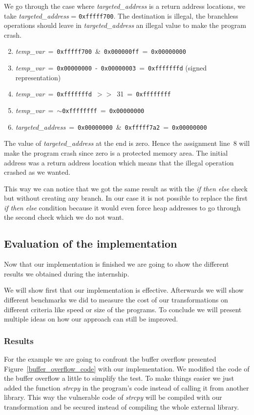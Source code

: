 \documentclass[11pt]{sdm}
\begin{document}
We go through the case where \textit{targeted\_address} is a return address locations, we take \textit{targeted\_address} = \texttt{0xfffff700}. 
The destination is illegal, the branchless operations should leave in \textit{targeted\_address} an illegal value to make the program crash.
\begin{enumerate}[noitemsep]
	\setcounter{enumi}{1}
	\item \textit{temp\_var}~=~\texttt{0xfffff700}~\&~\texttt{0x000000ff}~=~\texttt{0x00000000}
	\item \textit{temp\_var}~=~\texttt{0x00000000}~-~\texttt{0x00000003}~=~\texttt{0xfffffffd} (signed representation)
	\item \textit{temp\_var}~=~\texttt{0xfffffffd}~$>>$~31~=~\texttt{0xffffffff}
	\item \textit{temp\_var}~=~$\sim$\texttt{0xffffffff}~=~\texttt{0x00000000}
	\item \textit{targeted\_address}~=~\texttt{0x00000000}~\&~\texttt{0xfffff7a2}~=~\texttt{0x00000000}
\end{enumerate}
The value of \textit{targeted\_address} at the end is zero. Hence the assignment line~8 will make the program crash since zero is a protected memory area. The initial address was a return address location which means that the illegal operation crashed as we wanted.

This way we can notice that we got the same result as with the \textit{if then else} check but without creating any branch. In our case it is not possible to 
replace the first \textit{if then else} condition because it would even force heap addresses to go through the second check which we do not want.

\subsection{Evaluation of the implementation}
\label{sub:evaluation_of_implem}
Now that our implementation is finished we are going to show the different results we obtained during the internship.

We will show first that our implementation is effective. 
Afterwards we will show different benchmarks we did to measure the cost of our transformations on different criteria like speed or size of the programs.
To conclude we will present multiple ideas on how our approach can still be improved.

\subsubsection{Results}
For the example we are going to confront the buffer overflow presented Figure~\ref{buffer_overflow_code} with our implementation. We modified the code of the buffer overflow a little to simplify the test. To make things easier we just added the function \textit{strcpy} in the program's code instead of calling it from another library. This way the vulnerable code of \textit{strcpy} will be compiled with our transformation and be secured instead of compiling the whole external library.
\end{document}
